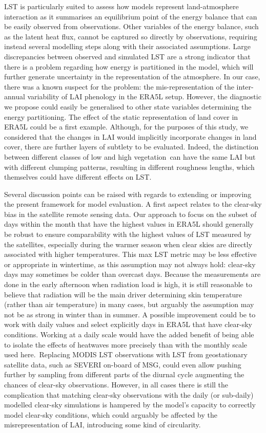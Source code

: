 \documentclass[gmd, manuscript]{copernicus}
\begin{document}
{LST is particularly suited to assess how models represent
land-atmosphere interaction as it summarises an equilibrium point of the
energy balance that can be easily observed from observations. Other
variables of the energy balance, such as the latent heat flux, cannot be
captured so directly by observations, requiring instead several
modelling steps along with their associated assumptions. Large
discrepancies between observed and simulated LST are a strong indicator
that there is a problem regarding how energy is partitioned in the
model, which will further generate uncertainty in the representation of
the atmosphere. In our case, there was a known suspect for the problem:
the mis-representation of the inter-annual variability of LAI phenology
in the ERA5L setup. However, the diagnostic we propose could easily be
generalised to other state variables determining the energy
partitioning. The effect of the static representation of land cover in
ERA5L could be a first example. Although, for the purposes of this
study, we considered that the changes in LAI would implicitly
incorporate changes in land cover, there are further layers of subtlety
to be evaluated. Indeed, the distinction between different classes of
low and high vegetation~can have the same LAI but with different
clumping patterns, resulting in different roughness lengths, which
themselves could have different effects on LST.

Several discussion points can be raised with regards to extending or
improving the present framework for model evaluation. A first aspect
relates to the clear-sky bias in the satellite remote sensing data. Our
approach to focus on the subset of days within the month that have the
highest values in ERA5L should generally be robust to ensure
comparability with the highest values of LST measured by the satellites,
especially during the warmer season when clear skies are directly
associated with higher temperatures. This max LST metric may be less
effective or appropriate in wintertime, as this assumption may not
always hold: clear-sky days may sometimes be colder than overcast days.
Because the measurements are done in the early afternoon when radiation
load is high, it is still reasonable to believe that radiation will be
the main driver determining skin temperature (rather than air
temperature) in many cases, but arguably the assumption may not be as
strong in winter than in summer. A possible improvement could be to work
with daily values and select explicitly days in ERA5L that have
clear-sky conditions. Working at a daily scale would have the added
benefit of being able to isolate the effects of heatwaves more precisely
than with the monthly scale used here.~Replacing MODIS LST observations
with LST from geostationary satellite data, such as SEVERI on-board of
MSG, could even allow pushing further by sampling from different parts
of the diurnal cycle augmenting the chances of clear-sky observations.
However, in all cases there is still the complication that matching
clear-sky observations with the daily (or sub-daily) modelled clear-sky
simulations is hampered by the model's capacity to correctly model
clear-sky conditions, which could arguably be affected by the
misrepresentation of LAI, introducing some kind of circularity.

}
\end{document}

